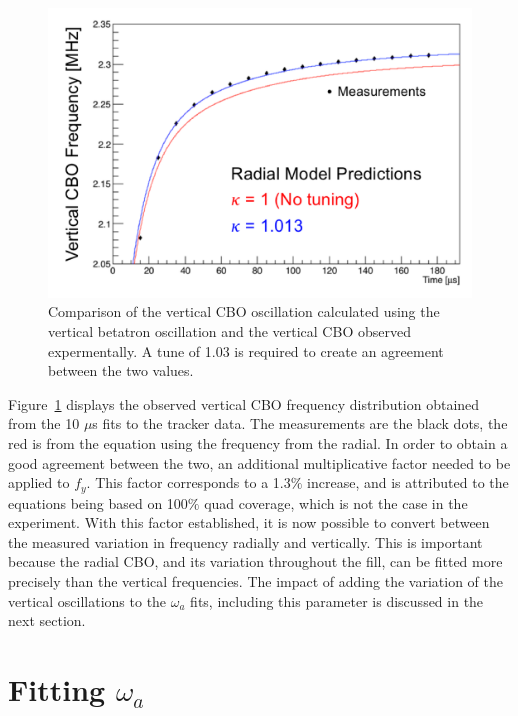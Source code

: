 \begin{figure}[ht]
\centering 
\includegraphics[scale=0.7]{Figures/VCBOvsFREQ.png}
\decoRule
\caption{Comparison of the vertical CBO oscillation calculated using the vertical betatron oscillation and the vertical CBO observed expermentally. A tune of 1.03 is required to create an agreement between the two values.}
\label{fig:VCBOvsFREQ}
\end{figure}

Figure~\ref{fig:VCBOvsFREQ} displays the observed vertical CBO frequency distribution obtained from the 10 $\mu$s fits to the tracker data. The measurements are the black dots, the red is from the equation using the frequency from the radial. In order to obtain a good agreement between the two, an additional multiplicative factor needed to be applied to $f_{y}$. This factor corresponds to a 1.3$\%$ increase, and is attributed to the equations being based on 100$\%$ quad coverage, which is not the case in the experiment. With this factor established, it is now possible to convert between the measured variation in frequency radially and vertically. This is important because the radial CBO, and its variation throughout the fill, can be fitted more precisely than the vertical frequencies. The impact of adding the variation of the vertical oscillations to the $\omega_{a}$ fits, including this parameter is discussed in the next section.  

\section{Fitting $\omega_{a}$}

